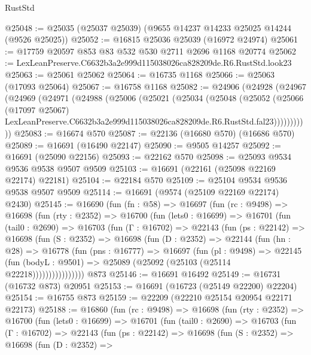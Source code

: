 \begin{lexlean}{RustStd}
\begin{coremodule}
@25048 := @25035 (@25037 @25039) (@9655 @14237 @14233 @25025 @14244 (@9526 @25025))
@25052 := @16815 @25036 @25039 (@16972 @24974)
@25061 := @17759 @20597 @853 @83 @532 @530 @2711 @2696 @1168 @20774
@25062 := LexLeanPreserve.C6632b3a2e999d115038026ca828209de.R6.RustStd.look23
@25063 := @25061 @25062
@25064 := @16735 @1168
@25066 := @25063 (@17093 @25064)
@25067 := @16758 @1168
@25082 := @24906
    (@24928
      (@24967
        (@24969
          (@24971
            (@24988
              (@25006
                (@25021
                  (@25034
                    (@25048
                      (@25052
                        (@25066
                          (@17097 @25067)
                          LexLeanPreserve.C6632b3a2e999d115038026ca828209de.R6.RustStd.fal23)))))))))))
@25083 := @16674 @570
@25087 := @22136 (@16680 @570) (@16686 @570)
@25089 := @16691 (@16490 @22147)
@25090 := @9505 @14257
@25092 := @16691 (@25090 @22156)
@25093 := @22162 @570
@25098 := @25093 @9534 @9536 @9538 @9507 @9509
@25103 := @16691 (@22161 (@25098 @22169 @22174) @22181)
@25104 := @22184 @570
@25109 := @25104 @9534 @9536 @9538 @9507 @9509
@25114 := @16691 (@9574 (@25109 @22169 @22174) @2430)
@25145 := @16690
    (fun (fn : @58) =>
    @16697
      (fun (rc : @9498) =>
      @16698
        (fun (rty : @2352) =>
        @16700
          (fun (lets0 : @16699) =>
          @16701
            (fun (tail0 : @2690) =>
            @16703
              (fun (Γ : @16702) =>
              @22143
                (fun (ps : @22142) =>
                @16698
                  (fun (S : @2352) =>
                  @16698
                    (fun (D : @2352) =>
                    @22144
                      (fun (hn : @28) =>
                      @16778
                        (fun (pns : @16777) =>
                        @16697
                          (fun (pl : @9498) =>
                          @22145
                            (fun (bodyL : @9501) =>
                            @25089 (@25092 (@25103 (@25114 @22218))))))))))))))))
    @873
@25146 := @16691 @16492
@25149 := @16731 (@16732 @873) @20951
@25153 := @16691 (@16723 (@25149 @22200) @22204)
@25154 := @16755 @873
@25159 := @22209 (@22210 @25154 @20954 @22171 @22173)
@25188 := @16860
    (fun (rc : @9498) =>
    @16698
      (fun (rty : @2352) =>
      @16700
        (fun (lets0 : @16699) =>
        @16701
          (fun (tail0 : @2690) =>
          @16703
            (fun (Γ : @16702) =>
            @22143
              (fun (ps : @22142) =>
              @16698
                (fun (S : @2352) =>
                @16698
                  (fun (D : @2352) =>

\end{coremodule}
\end{lexlean}

